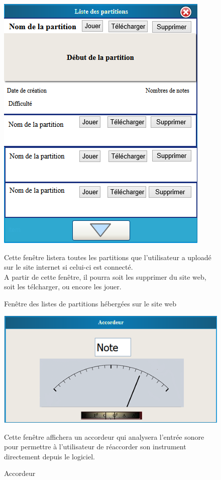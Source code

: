 \begin{figure}[H]

	\centering 
	\includegraphics[scale=0.6]{tab_list}
		\caption{Fenêtre des listes de partitions hébergées sur le site web}
			Cette fenêtre listera toutes les partitions que l'utilisateur a uploadé sur le site internet si 
			celui-ci est connecté. \\
			A partir de cette fenêtre, il pourra soit les supprimer du site web, soit les télcharger, ou 
			encore les jouer.
\end{figure}
\begin{figure}[H]

	\centering 
	\includegraphics[scale=0.8]{chord}
		\caption{Accordeur}
			Cette fenêtre affichera un accordeur qui analysera l'entrée sonore pour permettre à l'utilisateur
			de réaccorder son instrument directement depuis le logiciel.

\end{figure}
